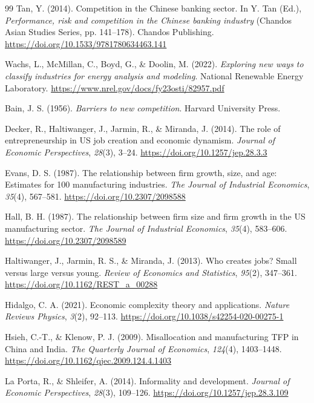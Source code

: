 \documentclass[acmtog, nonacm]{acmart}
\begin{document}
\begin{thebibliography}{99}
Tan, Y. (2014). Competition in the Chinese banking sector. In Y. Tan (Ed.), \textit{Performance, risk and competition in the Chinese banking industry} (Chandos Asian Studies Series, pp. 141--178). Chandos Publishing. \url{https://doi.org/10.1533/9781780634463.141}

Wachs, L., McMillan, C., Boyd, G., \& Doolin, M. (2022). \textit{Exploring new ways to classify industries for energy analysis and modeling}. National Renewable Energy Laboratory. \url{https://www.nrel.gov/docs/fy23osti/82957.pdf}

Bain, J. S. (1956). \textit{Barriers to new competition}. Harvard University Press.

Decker, R., Haltiwanger, J., Jarmin, R., \& Miranda, J. (2014). The role of entrepreneurship in US job creation and economic dynamism. \textit{Journal of Economic Perspectives}, \textit{28}(3), 3--24. \url{https://doi.org/10.1257/jep.28.3.3}

Evans, D. S. (1987). The relationship between firm growth, size, and age: Estimates for 100 manufacturing industries. \textit{The Journal of Industrial Economics}, \textit{35}(4), 567--581. \url{https://doi.org/10.2307/2098588}

Hall, B. H. (1987). The relationship between firm size and firm growth in the US manufacturing sector. \textit{The Journal of Industrial Economics}, \textit{35}(4), 583--606. \url{https://doi.org/10.2307/2098589}

Haltiwanger, J., Jarmin, R. S., \& Miranda, J. (2013). Who creates jobs? Small versus large versus young. \textit{Review of Economics and Statistics}, \textit{95}(2), 347--361. \url{https://doi.org/10.1162/REST_a_00288}

Hidalgo, C. A. (2021). Economic complexity theory and applications. \textit{Nature Reviews Physics}, \textit{3}(2), 92--113. \url{https://doi.org/10.1038/s42254-020-00275-1}

Hsieh, C.-T., \& Klenow, P. J. (2009). Misallocation and manufacturing TFP in China and India. \textit{The Quarterly Journal of Economics}, \textit{124}(4), 1403--1448. \url{https://doi.org/10.1162/qjec.2009.124.4.1403}

La Porta, R., \& Shleifer, A. (2014). Informality and development. \textit{Journal of Economic Perspectives}, \textit{28}(3), 109--126. \url{https://doi.org/10.1257/jep.28.3.109}


\end{thebibliography}
\end{document}
